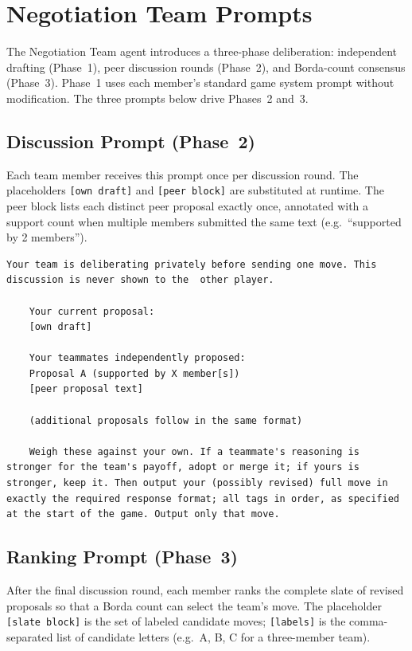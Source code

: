 \section{Negotiation Team Prompts}
\label{ap1:team-prompts}

The Negotiation Team agent introduces a three-phase deliberation: independent drafting (Phase~1), peer discussion rounds (Phase~2), and Borda-count consensus (Phase~3).
Phase~1 uses each member's standard game system prompt without modification. The three prompts below drive Phases~2 and~3.

\subsection{Discussion Prompt (Phase~2)}

Each team member receives this prompt once per discussion round. The placeholders \texttt{[own draft]} and \texttt{[peer block]} are substituted at runtime. The peer block lists each distinct peer proposal exactly once, annotated with a support count when multiple members submitted the same text (e.g.\ ``supported by 2 members'').

\begin{lstlisting}[caption={Negotiation Team discussion prompt (Phase~2).},label={lst:team-discussion}]
    Your team is deliberating privately before sending one move. This discussion is never shown to the  other player.

    Your current proposal:
    [own draft]

    Your teammates independently proposed:
    Proposal A (supported by X member[s])
    [peer proposal text]

    (additional proposals follow in the same format)

    Weigh these against your own. If a teammate's reasoning is stronger for the team's payoff, adopt or merge it; if yours is stronger, keep it. Then output your (possibly revised) full move in exactly the required response format; all tags in order, as specified at the start of the game. Output only that move.
\end{lstlisting}

\subsection{Ranking Prompt (Phase~3)}

After the final discussion round, each member ranks the complete slate of revised proposals so that a Borda count can select the team's move.
The placeholder \texttt{[slate block]} is the set of labeled candidate moves; \texttt{[labels]} is the comma-separated list of candidate letters (e.g.\ A, B, C for a three-member team).

